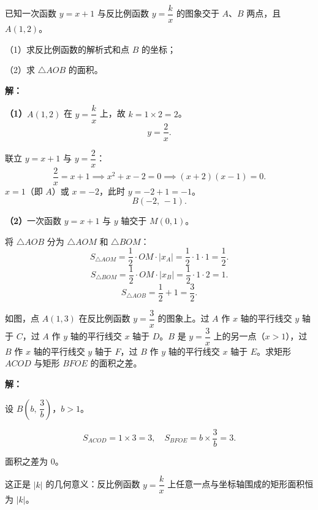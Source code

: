 \documentclass[12pt, a4paper]{ctexart}
\begin{document}
\begin{examplebox}[【例8】反比例函数与一次函数交点及面积]
已知一次函数 $y=x+1$ 与反比例函数 $y=\dfrac{k}{x}$ 的图象交于 $A$、$B$ 两点，且 $A(1,2)$。

（1）求反比例函数的解析式和点 $B$ 的坐标；

（2）求 $\triangle AOB$ 的面积。

\begin{center}
\end{center}

\textbf{解：}

\textbf{（1）}$A(1,2)$ 在 $y=\dfrac{k}{x}$ 上，故 $k=1\times 2=2$。
\[\boxed{y=\frac{2}{x}.}\]

联立 $y=x+1$ 与 $y=\dfrac{2}{x}$：
\[\frac{2}{x}=x+1 \implies x^2+x-2=0 \implies (x+2)(x-1)=0.\]
$x=1$（即 $A$）或 $x=-2$，此时 $y=-2+1=-1$。
\[\boxed{B(-2,\,-1).}\]

\textbf{（2）}一次函数 $y=x+1$ 与 $y$ 轴交于 $M(0,1)$。

将 $\triangle AOB$ 分为 $\triangle AOM$ 和 $\triangle BOM$：
\[S_{\triangle AOM}=\frac{1}{2}\cdot OM\cdot|x_A|=\frac{1}{2}\cdot 1\cdot 1=\frac{1}{2}.\]
\[S_{\triangle BOM}=\frac{1}{2}\cdot OM\cdot|x_B|=\frac{1}{2}\cdot 1\cdot 2=1.\]
\[\boxed{S_{\triangle AOB}=\frac{1}{2}+1=\frac{3}{2}.}\]
\end{examplebox}

\begin{examplebox}[【例9】反比例函数中的矩形面积之和]
如图，点 $A(1,3)$ 在反比例函数 $y=\dfrac{3}{x}$ 的图象上。过 $A$ 作 $x$ 轴的平行线交 $y$ 轴于 $C$，过 $A$ 作 $y$ 轴的平行线交 $x$ 轴于 $D$。$B$ 是 $y=\dfrac{3}{x}$ 上的另一点（$x>1$），过 $B$ 作 $x$ 轴的平行线交 $y$ 轴于 $F$，过 $B$ 作 $y$ 轴的平行线交 $x$ 轴于 $E$。求矩形 $ACOD$ 与矩形 $BFOE$ 的面积之差。

\textbf{解：}

设 $B\!\left(b,\,\dfrac{3}{b}\right)$，$b>1$。

\[S_{ACOD}=1\times 3=3,\quad S_{BFOE}=b\times\frac{3}{b}=3.\]

面积之差为 $\boxed{0}$。

这正是 $|k|$ 的几何意义：反比例函数 $y=\dfrac{k}{x}$ 上任意一点与坐标轴围成的矩形面积恒为 $|k|$。
\end{examplebox}
\end{document}
